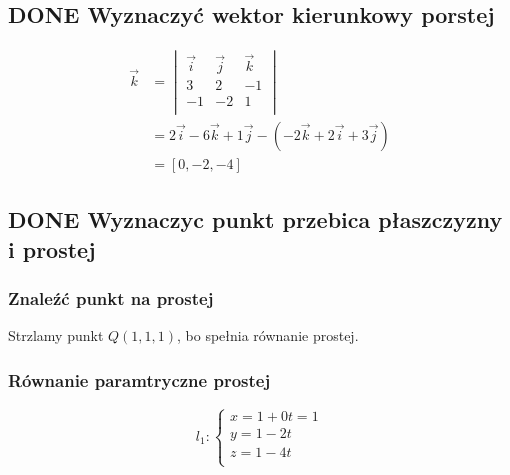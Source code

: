 \documentclass[11pt]{article}
\begin{document}
\subsection{{\bfseries\sffamily DONE} Wyznaczyć wektor kierunkowy porstej}
\label{sec:orgbda2b8f}
\begin{align*}
  \vec k &= \begin{vmatrix}
              \vec i & \vec j & \vec k\\
              3 & 2 & -1 \\
              -1 & -2 & 1\\
            \end{vmatrix}
  \\
         &= 2 \vec i - 6 \vec k + 1 \vec j - (-2 \vec k + 2 \vec i + 3 \vec j)
  \\
         &= [0, -2, -4]
\end{align*}
\subsection{{\bfseries\sffamily DONE} Wyznaczyc punkt przebica płaszczyzny i prostej}
\label{sec:org7c40d68}
\subsubsection{Znaleźć punkt na prostej}
\label{sec:orgb27b4a9}
Strzlamy punkt \(Q(1,1,1)\), bo spełnia równanie prostej.
\subsubsection{Równanie paramtryczne prostej}
\label{sec:orgb44288e}
\[l_1 : \begin{cases}
        x = 1 + 0t = 1\\
        y = 1 - 2t \\
        z = 1 - 4t\\
\end{cases}\]
\end{document}
